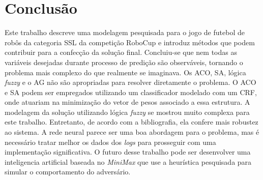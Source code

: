 \chapter{Conclusão}\label{cap:conclusao}

Este trabalho descreve uma modelagem pesquisada para o jogo de futebol de robôs
da categoria SSL da competição RoboCup e introduz métodos que podem contribuir
para a confecção da solução final. Concluiu-se que nem todas as variáveis
desejadas durante  processo de predição são observáveis, tornando o problema
mais complexo do que realmente se imaginava. Os ACO, SA,
lógica \textit{fuzzy} e o AG não são apropriadas para resolver diretamente o
problema. O ACO e SA podem ser empregados utilizando um classificador 
modelado com um CRF, onde atuariam na minimização do vetor de pesos associado
a essa estrutura. A modelagem da solução utilizando lógica \textit{fuzzy} se
mostrou muito complexa para este trabalho. Entretanto, de acordo com a
bibliografia, ela confere mais robustez ao sistema. A rede neural
parece ser uma boa abordagem para o problema, mas é necessário tratar melhor os
dados dos \textit{logs} para prosseguir com uma implementação significativa.
O futuro desse trabalho pode ser desenvolver uma inteligencia artificial baseada
no \textit{MiniMax} que use a heurística pesquisada para simular o comportamento
do adversário.


